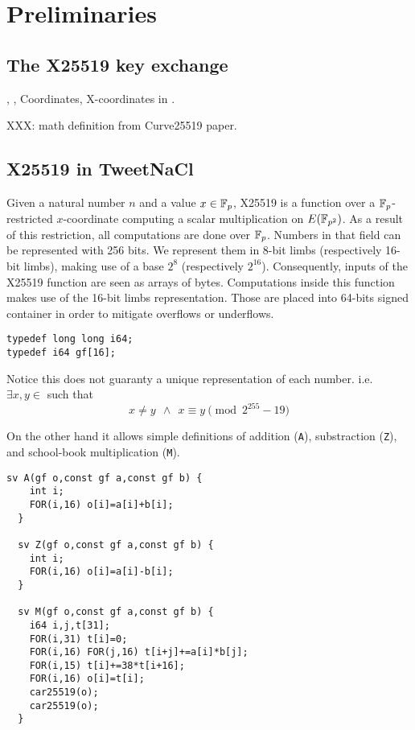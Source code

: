 \section{Preliminaries}
\label{preliminaries}
\subsection{The X25519 key exchange}

, , Coordinates, X-coordinates in .

XXX: math definition from Curve25519 paper.

\subsection{X25519 in TweetNaCl}

Given a natural number $n$ and a value $x \in \mathbb{F}_{p}$, X25519 is a function over a $\mathbb{F}_{p}$-restricted
$x$-coordinate computing a scalar multiplication on $E(\mathbb{F}_{p^2})$.
As a result of this restriction, all computations are done over $\mathbb{F}_{p}$.
Numbers in that field can be represented with 256 bits.
We represent them in 8-bit limbs (respectively 16-bit limbs),
making use of a base $2^8$ (respectively $2^{16}$).
Consequently, inputs of the X25519 function are seen as arrays of bytes.
Computations inside this function makes use of the 16-bit limbs representation.
Those are placed into 64-bits signed container in order to mitigate overflows or underflows.
\begin{lstlisting}[language=Ctweetnacl]
typedef long long i64;
typedef i64 gf[16];
\end{lstlisting}
Notice this does not guaranty a unique representation of each number. i.e.\\
$\exists x,y \in$  such that
\vspace{-0.25cm}
  $$x \neq y\ \ \land\ \ x \equiv y \pmod{2^{255}-19}$$

On the other hand it allows simple definitions of addition (\texttt{A}),
substraction (\texttt{Z}), and school-book multiplication (\texttt{M}).
  \begin{lstlisting}[language=Ctweetnacl]
  sv A(gf o,const gf a,const gf b) {
    int i;
    FOR(i,16) o[i]=a[i]+b[i];
  }

  sv Z(gf o,const gf a,const gf b) {
    int i;
    FOR(i,16) o[i]=a[i]-b[i];
  }

  sv M(gf o,const gf a,const gf b) {
    i64 i,j,t[31];
    FOR(i,31) t[i]=0;
    FOR(i,16) FOR(j,16) t[i+j]+=a[i]*b[j];
    FOR(i,15) t[i]+=38*t[i+16];
    FOR(i,16) o[i]=t[i];
    car25519(o);
    car25519(o);
  }
  \end{lstlisting}

